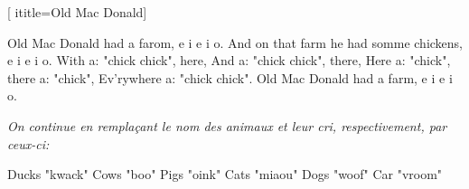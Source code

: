  [
ititle={Old Mac Donald}]

\beginverse
Old Mac Donald had a farom, e i e i o.
And on that farm he had somme chickens, e i e i o.
With a: "chick chick", here,
And a: "chick chick", there,
Here a: "chick", there a: "chick",
Ev'rywhere a: "chick chick".
Old Mac Donald had a farm, e i e i o.
\endverse

\emph{On continue en remplaçant le nom des animaux et leur cri, respectivement, par ceux-ci:}

\beginverse
Ducks "kwack"
Cows "boo"
Pigs "oink"
Cats "miaou"
Dogs "woof"
Car "vroom"
\endverse
\endsong